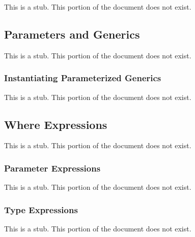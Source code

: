 This is a stub.  This portion of the document does not exist.

\subsection{Parameters and Generics}
\label{Parameters_and_Generics}

This is a stub.  This portion of the document does not exist.

\subsubsection{Instantiating Parameterized Generics}
\label{Instantiating_Parameterized_Generics}

This is a stub.  This portion of the document does not exist.

\subsection{Where Expressions}
\label{Where_Expressions}

This is a stub.  This portion of the document does not exist.

\subsubsection{Parameter Expressions}
\label{Parameter_Expressions}

This is a stub.  This portion of the document does not exist.

\subsubsection{Type Expressions}
\label{Type_Expressions}

This is a stub.  This portion of the document does not exist.
